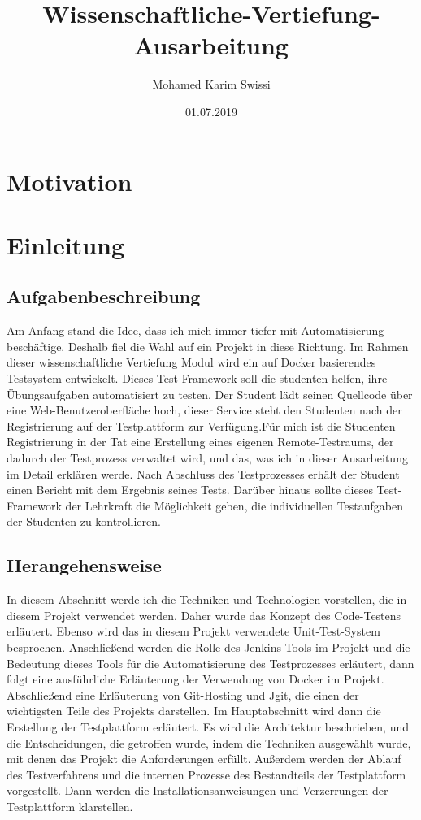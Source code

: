 \documentclass[apaper4,12p]{scrartcl}
\title{Wissenschaftliche-Vertiefung-Ausarbeitung}
\date{01.07.2019}
\author{Mohamed Karim Swissi  }
\begin{document}
\tableofcontents
\newpage

\section{Motivation}
\section{Einleitung}
\subsection{Aufgabenbeschreibung}

Am Anfang stand die Idee, dass ich mich immer tiefer mit Automatisierung beschäftige. Deshalb fiel die Wahl auf ein Projekt in diese Richtung.
Im Rahmen dieser wissenschaftliche Vertiefung Modul wird ein auf Docker basierendes Testsystem entwickelt.
Dieses Test-Framework soll die studenten helfen, ihre Übungsaufgaben automatisiert zu testen.
\newline
Der Student lädt seinen Quellcode über eine Web-Benutzeroberfläche hoch, dieser Service steht den Studenten nach der Registrierung auf der Testplattform zur Verfügung.Für mich ist die Studenten Registrierung in der Tat eine Erstellung eines eigenen Remote-Testraums, der dadurch der Testprozess verwaltet wird, und das, was ich in dieser Ausarbeitung im Detail erklären werde. Nach Abschluss des Testprozesses erhält der Student einen Bericht mit dem Ergebnis seines Tests. Darüber hinaus sollte dieses Test-Framework der Lehrkraft  die Möglichkeit geben, die individuellen Testaufgaben der Studenten zu kontrollieren.
\subsection{Herangehensweise}
In diesem Abschnitt werde ich die Techniken und Technologien vorstellen, die in diesem Projekt verwendet werden. Daher wurde das Konzept des Code-Testens erläutert. Ebenso wird das in diesem Projekt verwendete Unit-Test-System besprochen. Anschließend werden die Rolle des Jenkins-Tools im Projekt und die Bedeutung dieses Tools für die Automatisierung des Testprozesses erläutert, dann folgt eine ausführliche Erläuterung der Verwendung von Docker im Projekt. Abschließend eine Erläuterung von Git-Hosting und Jgit, die einen der wichtigsten Teile des Projekts darstellen.
\newline
Im Hauptabschnitt wird dann die Erstellung der Testplattform erläutert. Es wird die Architektur beschrieben, und die Entscheidungen, die getroffen wurde, indem die Techniken ausgewählt wurde, mit denen das Projekt die Anforderungen erfüllt. Außerdem werden der Ablauf des Testverfahrens und die internen Prozesse des Bestandteils der Testplattform vorgestellt. Dann werden die Installationsanweisungen und Verzerrungen der Testplattform klarstellen.
\end{document}
